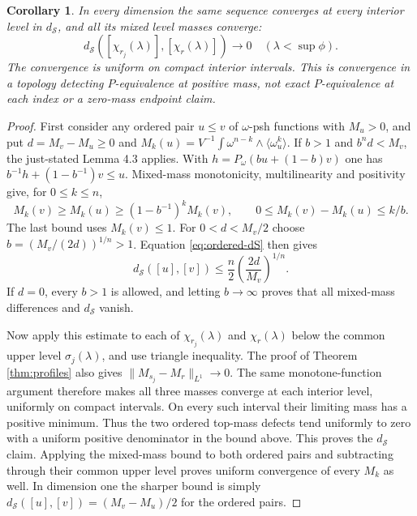 \documentclass[11pt]{article}
\newtheorem{corollary}[theorem]{Corollary}
\theoremstyle{remark}\newtheorem{remark}[theorem]{Remark}
\begin{document}
\begin{corollary}\label{cor:curves}
In every dimension the same sequence converges at every interior
level in $d_{\mathcal S}$, and all its mixed level masses converge:
\[
 d_{\mathcal S}([\chi_{r_j}(\lambda)],[\chi_r(\lambda)])\to0
 \quad(\lambda<\sup\phi).
\]
The convergence is uniform on compact interior intervals. This is
convergence in a topology detecting $P$-equivalence at positive mass,
not exact $P$-equivalence at each index or a zero-mass endpoint claim.
\end{corollary}
\begin{proof}
First consider any ordered pair $u\leq v$ of $\omega$-psh functions
with $M_u>0$, and put $d=M_v-M_u\geq0$ and
$M_k(u)=V^{-1}\int\omega^{n-k}\wedge
\langle\omega_u^k\rangle$. If $b>1$ and $b^n d<M_v$,
the just-stated Lemma 4.3 applies. With
$h=P_\omega(bu+(1-b)v)$ one has
$b^{-1}h+(1-b^{-1})v\leq u$. Mixed-mass monotonicity,
multilinearity and positivity give, for $0\leq k\leq n$,
\[
 M_k(v)\geq M_k(u)\geq(1-b^{-1})^kM_k(v),\qquad
 0\leq M_k(v)-M_k(u)\leq k/b.
\]
The last bound uses $M_k(v)\leq1$. For $0<d<M_v/2$ choose
$b=(M_v/(2d))^{1/n}>1$. Equation \eqref{eq:ordered-dS} then gives
\[
 d_{\mathcal S}([u],[v])\leq\frac{n}{2}
                   \left(\frac{2d}{M_v}\right)^{1/n}.
\]
If $d=0$, every $b>1$ is allowed, and letting $b\to\infty$
proves that all mixed-mass differences and $d_{\mathcal S}$ vanish.

Now apply this estimate to each of $\chi_{r_j}(\lambda)$ and
$\chi_r(\lambda)$ below the common upper level
$\sigma_j(\lambda)$, and use triangle inequality.
The proof of Theorem \ref{thm:profiles} also gives
$\|M_{s_j}-M_r\|_{L^1}\to0$. The same monotone-function argument
therefore makes all three masses converge at each interior level,
uniformly on compact intervals. On every such interval their
limiting mass has a positive minimum. Thus the two ordered top-mass
defects tend uniformly to zero with a uniform positive denominator
in the bound above. This proves the $d_{\mathcal S}$ claim.
Applying the mixed-mass bound to both ordered pairs and subtracting
through their common upper level proves uniform convergence of
every $M_k$ as well. In dimension one the sharper bound is simply
$d_{\mathcal S}([u],[v])=(M_v-M_u)/2$ for the ordered pairs.
\end{proof}
\end{document}
